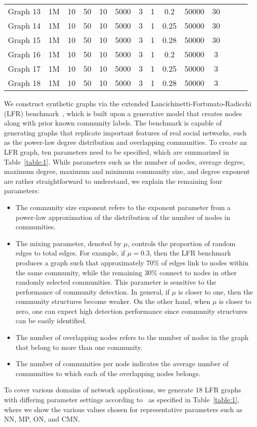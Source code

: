 \documentclass[format=acmsmall, review=false, screen=true]{acmart}
\begin{document}
\begin{table}[t]
\begin{tabular}{|c|c|c|c|c|c|c|c|c|c|c|c|c|c|}
Graph 13          & 1M    & 10    & 50  & 10    & 5000    & 3 
& 1    & 0.2    & 50000 & 30    \\ 
Graph 14          & 1M    & 10    & 50  & 10    & 5000    & 3 
& 1    & 0.25    & 50000 & 30    \\ 
Graph 15          & 1M    & 10    & 50  & 10    & 5000    & 3 
& 1    & 0.28    & 50000 & 30    \\ 
Graph 16          & 1M     & 10    & 50  & 10    & 5000    & 3 
& 1    & 0.2    & 50000 & 3    \\ 
Graph 17          & 1M     & 10    & 50  & 10    & 5000    & 3 
& 1    & 0.25    & 50000 & 3    \\ 
Graph 18         & 1M     & 10    & 50  & 10    & 5000    & 3 
& 1    & 0.28    & 50000 & 3    \\ 
\hline 
\end{tabular}
\end{table}
We construct synthetic graphs via the extended Lancichinetti-Fortunato-Radicchi (LFR) benchmark~\cite{lfr}, which is built upon a generative model that creates nodes along with prior known community labels. The benchmark is capable of generating graphs that replicate important features of real social networks, such as the power-law degree distribution and overlapping communities. To create an LFR graph, ten parameters need to be specified, which are summarized in Table~\ref{table:1}. While parameters such as the number of nodes, average degree, maximum degree, maximum and minimum community size, and degree exponent are rather straightforward to understand, we explain the remaining four parameters:
\begin{itemize}
\item The community size exponent refers to the exponent parameter from a power-law approximation of the distribution of the number of nodes in communities.
\item The mixing parameter, denoted by $\mu$, controls the proportion of random edges to total edges. For example, if $\mu = 0.3$, then the LFR benchmark produces a graph such that approximately 70\% of edges link to nodes within the same community, while the remaining 30\% connect to nodes in other randomly selected communities. This parameter is sensitive to the performance of community detection. In general, if $\mu$ is closer to one, then the community structures become weaker. On the other hand, when $\mu$ is closer to zero, one can expect high detection performance since community structures can be easily identified.
\item The number of overlapping nodes refers to the number of nodes in the graph that belong to more than one community.
\item The number of communities per node indicates the average number of communities to which each of the overlapping nodes belongs. 
\end{itemize}
To cover various domains of network applications, we generate 18 LFR graphs with differing parameter settings according to~\cite{xie2013overlapping} as specified in Table~\ref{table:1}, where we show the various values chosen for representative parameters such as NN, MP, ON, and CMN.
\end{document}
